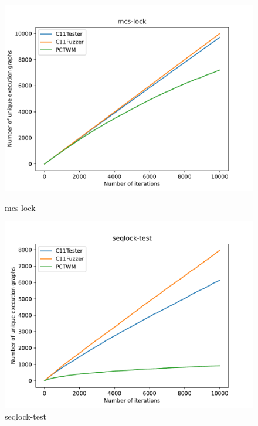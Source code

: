 \begin{figure}[H]
	\begin{minipage}{0.45\textwidth}
		\centering
		\includegraphics[width=\textwidth]{figure/pctwm/mcs-lock.pdf}
		\caption{mcs-lock}
		\label{pctwm-mcs-lock}
	\end{minipage}
	\hfill
	\begin{minipage}{0.45\textwidth}
		\centering
		\includegraphics[width=\textwidth]{figure/pctwm/seqlock-test.pdf}
		\caption{seqlock-test}
		\label{pctwm-seqlock-test}
	\end{minipage}
	\vspace{0.5cm}


\end{figure}
